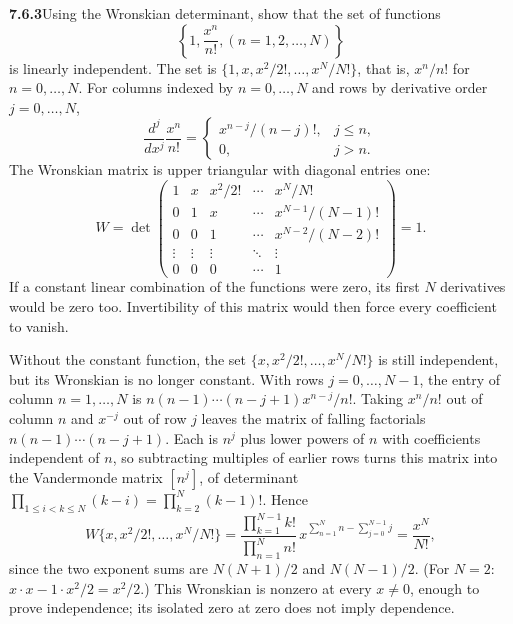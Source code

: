 \par\bigskip
\noindent\textbf{7.6.3}\quad Using the Wronskian determinant, show that the
set of functions
\[
\left\{1,\frac{x^{n}}{n!},(n=1,2,\ldots,N)\right\}
\]
is linearly independent.
\solution
The set is $\{1,x,x^2/2!,\ldots,x^N/N!\}$, that is, $x^n/n!$ for
$n=0,\ldots,N$. For columns indexed by $n=0,\ldots,N$ and rows by
derivative order $j=0,\ldots,N$,
\[
\frac{d^j}{dx^j}\frac{x^n}{n!}
=\begin{cases}x^{n-j}/(n-j)!,&j\le n,\\0,&j>n.\end{cases}
\]
The Wronskian matrix is upper triangular with diagonal entries one:
\[
W=\det\begin{pmatrix}
1&x&x^2/2!&\cdots&x^N/N!\\
0&1&x&\cdots&x^{N-1}/(N-1)!\\
0&0&1&\cdots&x^{N-2}/(N-2)!\\
\vdots&\vdots&\vdots&\ddots&\vdots\\0&0&0&\cdots&1
\end{pmatrix}=\boxed{1}.
\]
If a constant linear combination of the functions were zero, its first
$N$ derivatives would be zero too. Invertibility of this matrix would
then force every coefficient to vanish.

Without the constant function, the set $\{x,x^2/2!,\ldots,x^N/N!\}$
is still independent, but its Wronskian is no longer constant. With rows
$j=0,\ldots,N-1$, the entry of column $n=1,\ldots,N$ is
$n(n-1)\cdots(n-j+1)x^{n-j}/n!$. Taking $x^n/n!$ out of column $n$ and
$x^{-j}$ out of row $j$ leaves the matrix of falling factorials
$n(n-1)\cdots(n-j+1)$. Each is $n^j$ plus lower powers of $n$ with
coefficients independent of $n$, so subtracting multiples of earlier
rows turns this matrix into the Vandermonde matrix $[n^j]$, of
determinant $\prod_{1\le i<k\le N}(k-i)=\prod_{k=2}^N(k-1)!$. Hence
\[
W\{x,x^2/2!,\ldots,x^N/N!\}
=\frac{\prod_{k=1}^{N-1}k!}{\prod_{n=1}^Nn!}\,
 x^{\sum_{n=1}^Nn-\sum_{j=0}^{N-1}j}
=\boxed{\frac{x^N}{N!}},
\]
since the two exponent sums are $N(N+1)/2$ and $N(N-1)/2$. (For $N=2$:
$x\cdot x-1\cdot x^2/2=x^2/2$.)
This Wronskian is nonzero at every $x\ne0$, enough to prove independence;
its isolated zero at zero does not imply dependence.

